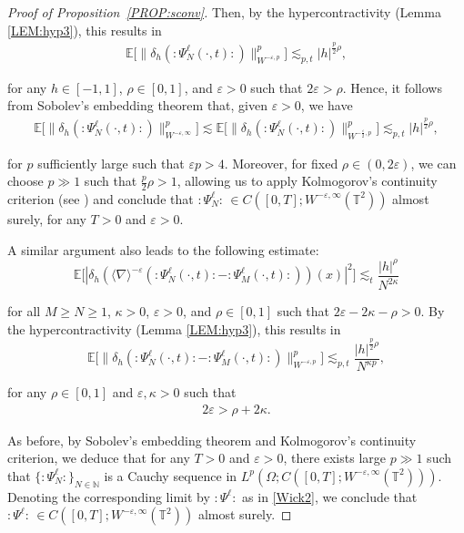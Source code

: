 \documentclass[letterpaper, 11pt,  reqno]{amsart}
\newcommand{\1}{\hspace{0.5mm}\text{I}\hspace{0.5mm}}
\newcommand{\noi}{\noindent}
\newcommand{\T}{\mathbb{T}}
\newcommand{\E}{\mathbb{E}}
\newcommand{\dl}{\delta}
\newcommand{\nb}{\nabla}
\newcommand{\eps}{\varepsilon}
\renewcommand{\l}{\ell}
\newcommand{\les}{\lesssim}
\newcommand{\jb}[1]
{\langle #1 \rangle}
\numberwithin{equation}{section}
\numberwithin{theorem}{section}
\begin{document}
\begin{proof}[Proof of Proposition~\ref{PROP:sconv}]
\noi
Then, by the hypercontractivity (Lemma \ref{LEM:hyp3}), 
this results in 
\begin{align*}
 \E \Big[\big\| \delta_h (: \!\Psi^{\ell}_N (\cdot, t) \!:) 
\big\|_{W^{- \eps,p}}^p \Big]
\les_{p, t} |h|^{\frac{p}{2}\rho}, 
\end{align*}

\noi
for any $h \in [-1,1]$, $\rho \in [0,1]$, and $\eps>0$ such that $2\eps > \rho$.
Hence,  it follows from  Sobolev's embedding theorem that,
given $\eps > 0$, we have
\begin{align*}
 \E \Big[\big\| \delta_h (: \!\Psi^{\ell}_N (\cdot, t) \!:) 
\big\|_{W^{- \eps,\infty}}^p \Big]
\les 
 \E \Big[\big\| \delta_h (: \!\Psi^{\ell}_N (\cdot, t) \!:) 
\big\|_{W^{- \frac{\eps}{2},p}}^p \Big]
\les_{p, t} |h|^{\frac{p}{2}\rho}, 
\end{align*}

\noi
for $p$ sufficiently large such  that $\eps p > 4$.
Moreover, for fixed  $\rho \in (0, 2\eps)$, 
we can choose $p \gg1 $ such that $\frac p2 \rho > 1$,
allowing us to apply  Kolmogorov's continuity criterion (see \cite[Theorem 8.2]{Bass})
and conclude that 
$ :\!\Psi^\l_N \!:\,  \in C([0, T]; W^{-\eps, \infty}(\T^2))$
almost surely,  for any $T > 0$ and $\eps > 0$.


A similar argument also leads  to the following estimate:
\[ \E \big[| \dl_h (\jb{\nb}^{-\eps} (:\! \Psi^{\ell}_N (\cdot, t)\! :  -  :\! \Psi^{\ell}_M (\cdot, t) \!:)) (x) |^2 \big]
   \les_t  \frac{|h|^{\rho}}{N^{2\kappa}} \]


\noi
for all  $M\ge N \ge 1$, $\kappa >0$,  $\eps >0$,
and $\rho\in[0,1]$
 such that $2\eps - 2\kappa - \rho>0$.
By the hypercontractivity (Lemma \ref{LEM:hyp3}), 
this results in 
\[ \E \Big[\big\| \delta_h (: \!\Psi^{\ell}_N (\cdot, t) \!: - : \!\Psi^{\l}_M (\cdot, t) \!:) 
\big\|_{W^{- \eps,p}}^p \Big]
\les_{p, t} \frac{|h|^{\frac{p}{2}\rho}}{N^{\kappa p}}, \]

\noi
for any $\rho \in [0,1]$ and $\eps,\kappa >0$ such that 
\begin{align}
2\eps > \rho + 2\kappa.
\label{G4}
\end{align} 

\noi
As before, 
by Sobolev's embedding theorem
and 
Kolmogorov's continuity criterion, 
 we deduce that for any $T > 0$ and $\eps > 0$,
  there exists large $p\gg1$ such that 
$\{ :\!\Psi^\l_N \!:  \}_{N \in \mathbb{N}}$ 
is a Cauchy sequence in $L^p(\Omega;  C ([0, T] ; W^{- \eps,\infty}(\T^2)))$. 
Denoting  the corresponding limit
by $: \!\Psi^{\ell} \!:$ as in \eqref{Wick2}, 
we conclude that  $: \!\Psi^{\ell} \!:\, \in C ([0, T] ; W^{- \eps,\infty}(\T^2))$ almost surely.
\end{proof}
\end{document}

